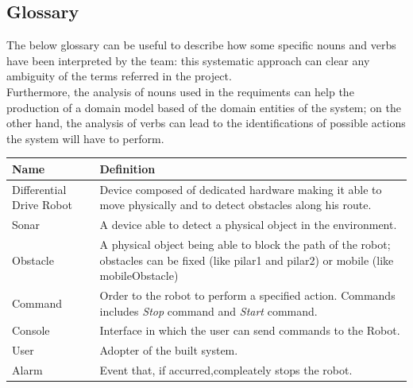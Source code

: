 \documentclass{llncs}
\begin{document}
\subsection{Glossary}
The below glossary can be useful to describe how some specific nouns and verbs have been interpreted by the team: this systematic approach can clear any ambiguity of the terms referred in the project.\\ Furthermore, the analysis of nouns used in the requiments can help the production of a domain model based of the domain entities of the system; on the other hand, the analysis of verbs can lead to the identifications of possible actions the system will have to perform.
\begin{center}
    \begin{tabular}{ | l |  p{8cm} |}
    \hline
    \textbf{Name} & \textbf{Definition} \\ \hline
    Differential Drive Robot & Device composed of dedicated hardware making it able to move physically and to detect obstacles along his route.\\ \hline
    Sonar & A device able to detect a physical object in the environment. \\ \hline
    Obstacle & A physical object being able to block the path of the robot; obstacles can be fixed (like pilar1 and pilar2) or mobile (like mobileObstacle)\\ \hline
    Command & Order to the robot to perform a specified action. Commands includes \textit{Stop} command and \textit{Start} command. \\ \hline %
    Console & Interface in which the user can send commands to the Robot. \\ \hline
    User & Adopter of the built system.\\ \hline
    Alarm & Event that, if accurred,compleately stops the robot.\\ \hline
    \end{tabular}
\end{center}
\end{document}

